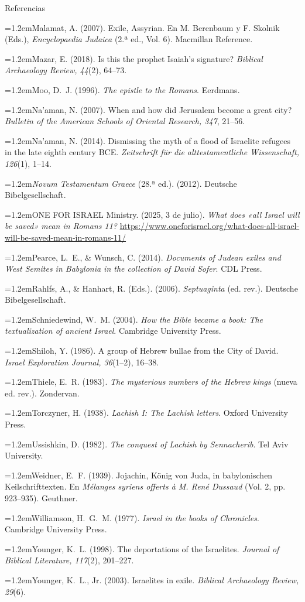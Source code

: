 \documentclass[hyperref={bookmarks=false},aspectratio=169]{beamer}
\newcommand{\refapa}[1]{\par\hangindent=1.2em\hangafter=1\noindent #1\par\vspace{3pt}}
\begin{document}
\begin{frame}[allowframebreaks]{Referencias}
\refapa{Malamat, A. (2007). Exile, Assyrian. En M. Berenbaum y F. Skolnik (Eds.), \emph{Encyclopaedia Judaica} (2.ª ed., Vol. 6). Macmillan Reference.}
\refapa{Mazar, E. (2018). Is this the prophet Isaiah's signature? \emph{Biblical Archaeology Review, 44}(2), 64--73.}
\refapa{Moo, D.~J. (1996). \emph{The epistle to the Romans}. Eerdmans.}
\refapa{Na'aman, N. (2007). When and how did Jerusalem become a great city? \emph{Bulletin of the American Schools of Oriental Research, 347}, 21--56.}
\refapa{Na'aman, N. (2014). Dismissing the myth of a flood of Israelite refugees in the late eighth century BCE. \emph{Zeitschrift für die alttestamentliche Wissenschaft, 126}(1), 1--14.}
\refapa{\emph{Novum Testamentum Graece} (28.ª ed.). (2012). Deutsche Bibelgesellschaft.}
\refapa{ONE FOR ISRAEL Ministry. (2025, 3 de julio). \emph{What does «all Israel will be saved» mean in Romans 11?} \url{https://www.oneforisrael.org/what-does-all-israel-will-be-saved-mean-in-romans-11/}}
\refapa{Pearce, L.~E., \& Wunsch, C. (2014). \emph{Documents of Judean exiles and West Semites in Babylonia in the collection of David Sofer}. CDL Press.}
\refapa{Rahlfs, A., \& Hanhart, R. (Eds.). (2006). \emph{Septuaginta} (ed. rev.). Deutsche Bibelgesellschaft.}
\refapa{Schniedewind, W.~M. (2004). \emph{How the Bible became a book: The textualization of ancient Israel}. Cambridge University Press.}
\refapa{Shiloh, Y. (1986). A group of Hebrew bullae from the City of David. \emph{Israel Exploration Journal, 36}(1--2), 16--38.}
\refapa{Thiele, E.~R. (1983). \emph{The mysterious numbers of the Hebrew kings} (nueva ed. rev.). Zondervan.}
\refapa{Torczyner, H. (1938). \emph{Lachish I: The Lachish letters}. Oxford University Press.}
\refapa{Ussishkin, D. (1982). \emph{The conquest of Lachish by Sennacherib}. Tel Aviv University.}
\refapa{Weidner, E.~F. (1939). Jojachin, König von Juda, in babylonischen Keilschrifttexten. En \emph{Mélanges syriens offerts à M. René Dussaud} (Vol. 2, pp. 923--935). Geuthner.}
\refapa{Williamson, H.~G.~M. (1977). \emph{Israel in the books of Chronicles}. Cambridge University Press.}
\refapa{Younger, K.~L. (1998). The deportations of the Israelites. \emph{Journal of Biblical Literature, 117}(2), 201--227.}
\refapa{Younger, K.~L., Jr. (2003). Israelites in exile. \emph{Biblical Archaeology Review, 29}(6).}
\end{frame}
\end{document}
